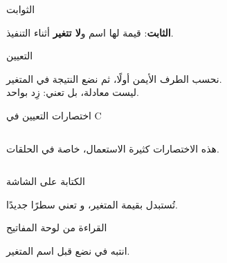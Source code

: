 \documentclass[aspectratio=169, 11pt, t, xcolor={table}]{beamer}
\begin{document}
\begin{frame}{الثوابت}
    \begin{center}
    \begin{minipage}{0.62\textwidth}
    \end{minipage}
    \end{center}
    \vspace{0.3cm}
    \textbf{الثابت}: قيمة لها اسم و\textbf{لا تتغير} أثناء التنفيذ.
\end{frame}

\begin{frame}{التعيين}
    \begin{center}
    \begin{minipage}{0.62\textwidth}
    \end{minipage}
    \end{center}
    \vspace{0.3cm}
    نحسب الطرف الأيمن أولًا، ثم نضع النتيجة في المتغير.\\
     ليست معادلة، بل تعني: زِد  بواحد.
\end{frame}

\begin{frame}{اختصارات التعيين في \textenglish{C}}
    \begin{columns}[T]
        هذه الاختصارات كثيرة الاستعمال، خاصة في الحلقات.
    \end{columns}
\end{frame}

\begin{frame}{الكتابة على الشاشة}
    \begin{center}
    \begin{minipage}{0.62\textwidth}
    \end{minipage}
    \end{center}
    \vspace{0.3cm}
     تُستبدل بقيمة المتغير، و تعني سطرًا جديدًا.
\end{frame}

\begin{frame}{القراءة من لوحة المفاتيح}
    \begin{center}
    \begin{minipage}{0.62\textwidth}
    \end{minipage}
    \end{center}
    \vspace{0.3cm}
    \begin{obox}{\faExclamationTriangle\quad انتبه}
        في  نضع \code{\&} قبل اسم المتغير.
    \end{obox}
\end{frame}
\end{document}

